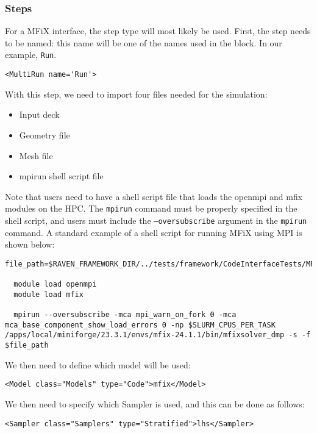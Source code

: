 \subsubsection{Steps}
For a MFiX interface, the  step type will most likely be used.
First, the step needs to be named: this name will be one of the names used in the  block.
In our example, \texttt{Run}.
%
\begin{lstlisting}[style=XML,morekeywords={name,debug,re-seeding}]
     <MultiRun name='Run'>
\end{lstlisting}

With this step, we need to import four files needed for the simulation:
\begin{itemize}
  \item Input deck
  \item Geometry file
  \item Mesh file
  \item mpirun shell script file
\end{itemize}
Note that users need to have a shell script file that loads the openmpi and mfix modules on the HPC.
The \texttt{mpirun} command must be properly specified in the shell script, and users must include the \texttt{--oversubscribe} argument in the \texttt{mpirun} command.
A standard example of a shell script for running MFiX using MPI is shown below:

\begin{lstlisting}[style=sh, morekeywords={name, debug, re-seeding}]
  file_path=$RAVEN_FRAMEWORK_DIR/../tests/framework/CodeInterfaceTests/MFiX/MFiX_Sampling_Submission_Postprocess/Run/$2/MFIX_RAVEN_Temp.mfx

  module load openmpi
  module load mfix

  mpirun --oversubscribe -mca mpi_warn_on_fork 0 -mca mca_base_component_show_load_errors 0 -np $SLURM_CPUS_PER_TASK /apps/local/miniforge/23.3.1/envs/mfix-24.1.1/bin/mfixsolver_dmp -s -f $file_path
\end{lstlisting}

We then need to define which model will be used:
\begin{lstlisting}[style=XML]
  <Model class="Models" type="Code">mfix</Model>
\end{lstlisting}

We then need to specify which Sampler is used, and this can be done as follows:
\begin{lstlisting}[style=XML]
  <Sampler class="Samplers" type="Stratified">lhs</Sampler>
\end{lstlisting}

